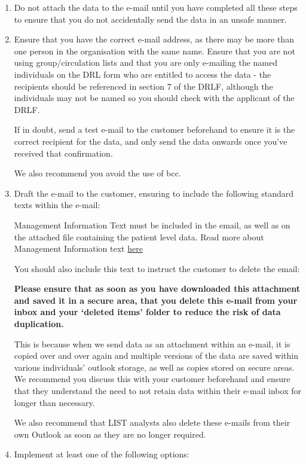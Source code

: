 \documentclass[
]{book}
\begin{document}
\begin{enumerate}
\def\labelenumi{\arabic{enumi}.}
\item
  Do not attach the data to the e-mail until you have completed all these steps to ensure that you do not accidentally send the data in an unsafe manner.
\item
  Ensure that you have the correct e-mail address, as there may be more than one person in the organisation with the same name. Ensure that you are not using group/circulation lists and that you are only e-mailing the named individuals on the DRL form who are entitled to access the data - the recipients should be referenced in section 7 of the DRLF, although the individuals may not be named so you should check with the applicant of the DRLF.

  If in doubt, send a test e-mail to the customer beforehand to ensure it is the correct recipient for the data, and only send the data onwards once you've received that confirmation.

  We also recommend you avoid the use of bcc.
\item
  Draft the e-mail to the customer, ensuring to include the following standard texts within the e-mail:

  Management Information Text must be included in the email, as well as on the attached file containing the patient level data. Read more about Management Information text \protect\hyperlink{managementinformation}{here}

  You should also include this text to instruct the customer to delete the email:

  \textbf{Please ensure that as soon as you have downloaded this attachment and saved it in a secure area, that you delete this e-mail from your inbox and your `deleted items' folder to reduce the risk of data duplication.}

  This is because when we send data as an attachment within an e-mail, it is copied over and over again and multiple versions of the data are saved within various individuals' outlook storage, as well as copies stored on secure areas. We recommend you discuss this with your customer beforehand and ensure that they understand the need to not retain data within their e-mail inbox for longer than necessary.

  We also recommend that LIST analysts also delete these e-mails from their own Outlook as soon as they are no longer required.
\item
  Implement at least one of the following options:


\end{enumerate}
\end{document}
